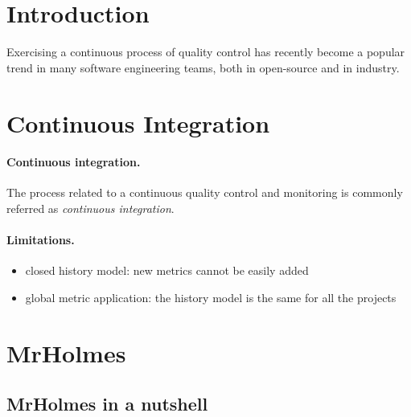 \documentclass[runningheads]{llncs}
\newcommand{\seclabel}[1]{\label{sec:#1}}
\begin{document}

\section{Introduction} \seclabel{introduction}

Exercising a continuous process of quality control has recently become a popular trend in many software engineering teams, both in open-source and in industry. 


\section{Continuous Integration} \seclabel{problem}

\paragraph{Continuous integration.} The process related to a continuous quality control and monitoring is commonly referred as \emph{continuous integration}. 

\paragraph{Limitations.} 

\begin{itemize}
\item closed history model: new metrics cannot be easily added
\item global metric application: the history model is the same for all the projects
\end{itemize}

\section{MrHolmes} \seclabel{klotz}

\subsection{MrHolmes in a nutshell} \seclabel{nutshell}
\end{document}
